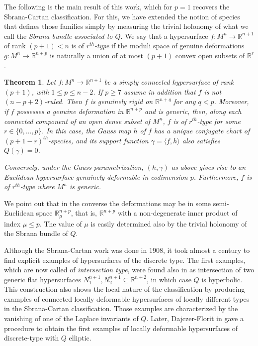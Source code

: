 \documentclass{article}
\newtheorem{thm}{Theorem}[section]
\theoremstyle{remark}
\begin{document}
The following is the main result of this work, which for $p=1$ recovers the Sbrana-Cartan classification. For this, we have extended the notion of species that defines those families simply by measuring the trivial holonomy of what we call the {\it Sbrana bundle associated to $Q$}. 
We say that a hypersurface $f:M^n\rightarrow\mathbb{R}^{n+1}$ of rank $(p+1)<n$ is of {\it $r^{th}$-type} if the moduli space of genuine deformations $g:M^n\rightarrow\mathbb{R}^{n+p}$ is naturally a union of at most $(p+1)$ convex open subsets of $\mathbb{R}^r$. 
\begin{thm}\label{teorema introduccion}
    Let $f:M^n\rightarrow\mathbb{R}^{n+1}$ be a simply connected hypersurface of rank $(p+1)$, with $1\leq p\leq n-2$. If $p\geq 7$ assume in addition that $f$ is not $(n-p+2)$-ruled. Then $f$ is genuinely rigid on $\mathbb{R}^{n+q}$ for any $q<p$. Moreover, if $f$ possesses a genuine deformation in $\mathbb{R}^{n+p}$ and is generic, then, along each connected component of an open dense subset of $M^n$, $f$ is of $r^{th}$-type for some $r\in\{0,\ldots,p\}$. In this case, the Gauss map $h$ of $f$ has a unique conjugate chart of $(p+1-r)^{th}$-species, and its support function $\gamma=\langle f,h\rangle$ also satisfies $Q(\gamma)=0$.
    
    Conversely, under the Gauss parametrization, $(h,\gamma)$ as above gives rise to an Euclidean hypersurface genuinely deformable in codimension $p$. Furthermore, $f$ is of $r^{th}$-type where $M^n$ is generic.
\end{thm}
We point out that in the converse the deformations may be in some semi-Euclidean space $\mathbb{R}^{n+p}_{\mu}$, that is, $\mathbb{R}^{n+p}$ with a non-degenerate inner product of index $\mu\leq p$. The value of $\mu$ is easily determined also by the trivial holonomy of the Sbrana bundle of $Q$. 

Although the Sbrana-Cartan work was done in 1908, it took almost a century to find explicit examples of hypersurfaces of the discrete type. The first examples, which are now called of {\it intersection type}, were found also in \cite{DFT2} as intersection of two generic flat hypersurfaces $N^{n+1}_1, N^{n+1}_2\subseteq\mathbb{R}^{n+2}$, in which case $Q$ is hyperbolic. 
This construction also shows the local nature of the classification by producing examples of connected locally deformable hypersurfaces of locally different types in the Sbrana-Cartan classification. Those examples are characterized by the vanishing of one of the Laplace invariants of $Q$.
Later, Dajczer-Florit in \cite{DF} gave a procedure to obtain the first examples of locally deformable hypersurfaces of discrete-type with $Q$ elliptic.
\end{document}

